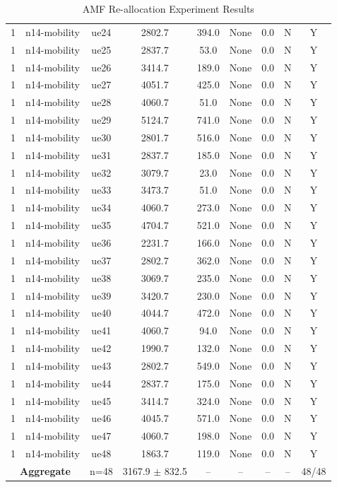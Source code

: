 \begin{table}[ht]
\begin{tabular}{|c|c|c|c|c|c|c|c|c|}
1 & n14-mobility & ue24 & 2802.7 & 394.0 & None & 0.0 & N & Y \\
1 & n14-mobility & ue25 & 2837.7 & 53.0 & None & 0.0 & N & Y \\
1 & n14-mobility & ue26 & 3414.7 & 189.0 & None & 0.0 & N & Y \\
1 & n14-mobility & ue27 & 4051.7 & 425.0 & None & 0.0 & N & Y \\
1 & n14-mobility & ue28 & 4060.7 & 51.0 & None & 0.0 & N & Y \\
1 & n14-mobility & ue29 & 5124.7 & 741.0 & None & 0.0 & N & Y \\
1 & n14-mobility & ue30 & 2801.7 & 516.0 & None & 0.0 & N & Y \\
1 & n14-mobility & ue31 & 2837.7 & 185.0 & None & 0.0 & N & Y \\
1 & n14-mobility & ue32 & 3079.7 & 23.0 & None & 0.0 & N & Y \\
1 & n14-mobility & ue33 & 3473.7 & 51.0 & None & 0.0 & N & Y \\
1 & n14-mobility & ue34 & 4060.7 & 273.0 & None & 0.0 & N & Y \\
1 & n14-mobility & ue35 & 4704.7 & 521.0 & None & 0.0 & N & Y \\
1 & n14-mobility & ue36 & 2231.7 & 166.0 & None & 0.0 & N & Y \\
1 & n14-mobility & ue37 & 2802.7 & 362.0 & None & 0.0 & N & Y \\
1 & n14-mobility & ue38 & 3069.7 & 235.0 & None & 0.0 & N & Y \\
1 & n14-mobility & ue39 & 3420.7 & 230.0 & None & 0.0 & N & Y \\
1 & n14-mobility & ue40 & 4044.7 & 472.0 & None & 0.0 & N & Y \\
1 & n14-mobility & ue41 & 4060.7 & 94.0 & None & 0.0 & N & Y \\
1 & n14-mobility & ue42 & 1990.7 & 132.0 & None & 0.0 & N & Y \\
1 & n14-mobility & ue43 & 2802.7 & 549.0 & None & 0.0 & N & Y \\
1 & n14-mobility & ue44 & 2837.7 & 175.0 & None & 0.0 & N & Y \\
1 & n14-mobility & ue45 & 3414.7 & 324.0 & None & 0.0 & N & Y \\
1 & n14-mobility & ue46 & 4045.7 & 571.0 & None & 0.0 & N & Y \\
1 & n14-mobility & ue47 & 4060.7 & 198.0 & None & 0.0 & N & Y \\
1 & n14-mobility & ue48 & 1863.7 & 119.0 & None & 0.0 & N & Y \\
\multicolumn{2}{|c|}{\textbf{Aggregate}} & n=48 & 3167.9 $\pm$ 832.5 & -- & -- & -- & -- & 48/48 \\
\hline
\end{tabular}
\caption{AMF Re-allocation Experiment Results}
\label{tab:amf_realloc}
\end{table}
